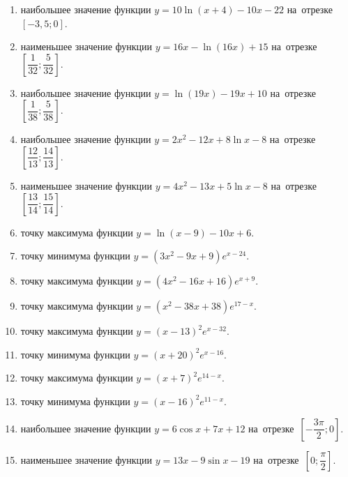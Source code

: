 \documentclass[a4paper,10pt]{article}
\begin{document}
\begin{enumerate}
\item {} наибольшее значение функции $y = 10\ln \left(x+4\right)-10x -22$ на~отрезке~$\left[-3,5;0\right]$.

\item {} наименьшее значение функции $y = 16x-\ln \left(16x\right)+15$ на~отрезке~$\left[\dfrac{1}{32};\dfrac{5}{32}\right]$.

\item {} наибольшее значение функции $y = \ln \left(19x\right)-19x+10$ на~отрезке~$\left[\dfrac{1}{38};\dfrac{5}{38}\right]$.

\item {} наибольшее значение функции $y=2x^2-12x+8\ln x-8$ на~отрезке~$\left[\dfrac{12}{13};\dfrac{14}{13}\right]$.

\item {} наименьшее значение функции $y=4x^2-13x+5\ln x-8$ на~отрезке~$\left[\dfrac{13}{14};\dfrac{15}{14}\right]$.

\item {} точку максимума функции $y=\ln \left(x-9\right)-10x+6$.

\item {} точку минимума функции $y=\left(3x^2-9x+9\right)e^{x-24}$.

\item {} точку максимума функции $y=\left(4x^2-16x+16\right)e^{x+9}$.

\item {} точку максимума функции $y=\left(x^2-38x+38\right)e^{17-x}$.

\item {} точку максимума функции $y=\left(x -13\right)^2e^{x-32}$.

\item {} точку минимума функции $y=\left(x +20\right)^2e^{x-16}$.

\item {} точку максимума функции $y=\left(x +7\right)^2e^{14-x}$.

\item {} точку минимума функции $y=\left(x -16\right)^2e^{11-x}$.

\item {} наибольшее значение функции $y=6\cos x+7x +12$ на~отрезке~$\left[-\dfrac{3\pi }{2};0\right]$.

\item {} наименьшее значение функции $y=13x-9\sin x -19$ на~отрезке~$\left[0;\dfrac{\pi }{2}\right]$.


\end{enumerate}
\end{document}
